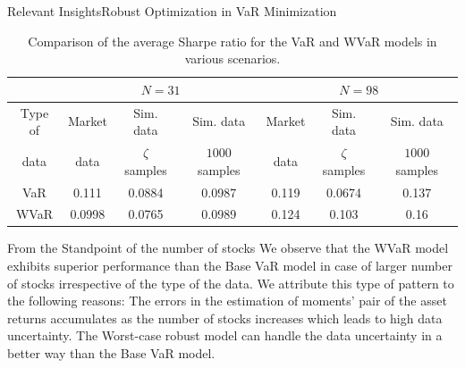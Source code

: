 \documentclass{beamer}
\begin{document}
\begin{frame}{Relevant Insights}{Robust Optimization in VaR Minimization}
\begin{table}[!h]
  \centering
  \tiny
    \captionsetup{justification=centering}
  \begin{tabular}{|c|c|c|c|c|c|c|}
    \hline
   \multirow{2}{*}{} $N$ &
      \multicolumn{3}{c|}{$N=31$} &
      \multicolumn{3}{c|}{$N=98$}  \\
    \hline
    Type of & Market & Sim. data & Sim. data & Market & Sim. data & Sim. data \\
    data & data & $\zeta$ samples & $1000$ samples & data & $\zeta$ samples & $1000$ samples \\
    \hline
    VaR & 0.111 & 0.0884 & 0.0987 & 0.119 & 0.0674 & 0.137 \\
    \hline
    WVaR & 0.0998 & 0.0765 & 0.0989 & 0.124 & 0.103 & 0.16 \\
    \hline
    
  \end{tabular}
  \caption{Comparison of the average Sharpe ratio for the VaR and WVaR models in various scenarios.}
  \label{tab:var_conc}
\end{table}
\begin{block}{From the Standpoint of the number of stocks}
We observe that the WVaR model exhibits superior performance than the Base VaR model in case of larger number of stocks irrespective of the type of the data. We attribute this type of pattern to the following reasons: The errors in the estimation of moments' pair of the asset returns accumulates as the number of stocks increases which leads to high data uncertainty. The Worst-case robust model can handle the data uncertainty in a better way than the Base VaR model.
\end{block}
\end{frame}
\end{document}
